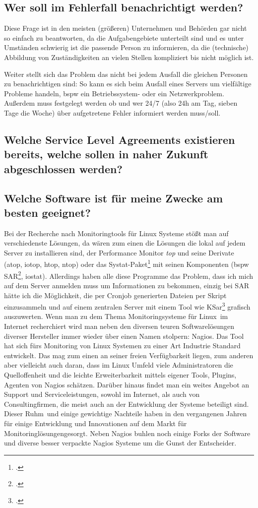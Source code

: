 \documentclass[12pt,a4paper,parskip,listof=totoc,bibliography=totoc]{scrreprt}
\begin{document}
	\subsection{Wer soll im Fehlerfall benachrichtigt werden?}
	Diese Frage ist in den meisten (größeren) Unternehmen und Behörden gar nicht so einfach zu beantworten, da die Aufgabengebiete unterteilt sind und es unter Umständen schwierig ist die passende Person zu informieren, da die (technische) Abbildung von Zuständigkeiten an vielen Stellen kompliziert bis nicht möglich ist. 
	
	Weiter stellt sich das Problem das nicht bei jedem Ausfall die gleichen Personen zu benachrichtigen sind:
	So kann es sich beim Ausfall eines Servers um vielfältige Probleme handeln, \acrlong{bspw} ein Betriebssystem- oder ein Netzwerkproblem.
	Außerdem muss festgelegt werden ob und wer 24/7 (also 24h am Tag, sieben Tage die Woche) über aufgetretene Fehler informiert werden muss/soll.
	\subsection{Welche Service Level Agreements existieren bereits, welche sollen in naher Zukunft abgeschlossen werden?}
	\subsection{Welche Software ist für meine Zwecke am besten geeignet?}
	Bei der Recherche nach Monitoringtools für Linux Systeme stößt man auf verschiedenste Lösungen, da wären zum einen die Lösungen die lokal auf jedem Server zu installieren sind, der Performance Monitor \textit{top} und seine Derivate (atop, iotop, htop, ntop) oder das Systat-Paket\footcite{sysstat} mit seinen Komponenten (\acrlong{bspw} SAR\footcite{sarkrenn}, iostat). Allerdings haben alle diese Programme das Problem, dass ich mich auf dem Server anmelden muss um Informationen zu bekommen, einzig bei SAR hätte ich die Möglichkeit, die per Cronjob generierten Dateien per Skript einzusammeln und auf einem zentralen Server mit einem Tool wie KSar\footcite{ksar} grafisch auszuwerten.
	Wenn man zu dem Thema \glqq Monitoringsysteme für Linux\grqq\ im Internet recherchiert wird man neben den diversen teuren Softwarelösungen diverser Hersteller immer wieder über einen Namen stolpern: Nagios. Das Tool hat sich fürs Monitoring von Linux Systemen zu einer Art Industrie Standard entwickelt. Das mag zum einen an seiner freien Verfügbarkeit liegen, zum anderen aber vielleicht auch daran, dass im Linux Umfeld viele Administratoren die Quelloffenheit und die leichte Erweiterbarkeit mittels eigener Tools, Plugins, Agenten von Nagios schätzen. Darüber hinaus findet man ein weites Angebot an Support und Serviceleistungen, sowohl im Internet, als auch von Consultingfirmen, die meist auch an der Entwicklung der Systeme beteiligt sind. Dieser \glqq Ruhm\grqq\ und einige gewichtige Nachteile haben in den vergangenen Jahren für einige Entwicklung und Innovationen auf dem \glqq Markt für Monitoringlösungen\grqq gesorgt. Neben Nagios buhlen noch einige Forks der Software und diverse besser verpackte Nagios Systeme um die Gunst der Entscheider.
	
\end{document}
